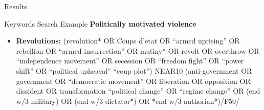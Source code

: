 \documentclass[aspectratio=169,10pt]{beamer}
\begin{document}
\begin{section}[Results]{Results}

\begin{frame}{Keywords Search Example}
\textbf{Politically motivated violence}
\scriptsize
\begin{itemize}
    \item \textbf{Revolutions:}
(revolution* OR Coups d’etat OR “armed uprising” OR rebellion OR “armed insurrection” OR mutiny* OR revolt OR overthrow OR “independence movement” OR secession OR “freedom fight” OR “power shift” OR “political upheaval” “coup plot”) NEAR10 (anti-government OR government OR “democratic movement” OR liberation OR opposition OR dissident OR transformation “political change” OR “regime change” OR (end w/3 military) OR (end w/3 dictator*) OR *end w/3 authorian*)/F50/



\end{itemize}
\end{frame}
\end{section}
\end{document}
